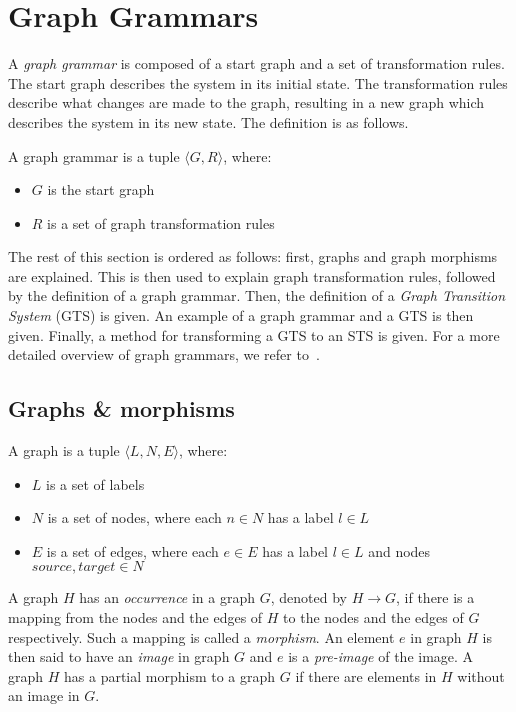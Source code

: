 \section{Graph Grammars}\label{sec:graph}
A \textit{graph grammar} is composed of a start graph and a set of transformation rules. The start graph describes the system in its initial state. The transformation rules describe what changes are made to the graph, resulting in a new graph which describes the system in its new state. The definition is as follows.

\begin{definition}
A graph grammar is a tuple $\langle G, R\rangle$, where:
\begin{itemize}
  \item $G$ is the start graph
  \item $R$ is a set of graph transformation rules
\end{itemize}
\end{definition} 

The rest of this section is ordered as follows: first, graphs and graph morphisms are explained. This is then used to explain graph transformation rules, followed by the definition of a graph grammar. Then, the definition of a \textit{Graph Transition System} (GTS) is given. An example of a graph grammar and a GTS is then given. Finally, a method for transforming a GTS to an STS is given. For a more detailed overview of graph grammars, we refer to~\cite{Rensink:graph_grammars, Heckel2006187, Andries1999}.

\subsection{Graphs \& morphisms}
\begin{definition}
A graph is a tuple $\langle L, N, E\rangle$, where:
\begin{itemize}
  \item $L$ is a set of labels
  \item $N$ is a set of nodes, where each $n \in N$ has a label $l \in L$
  \item $E$ is a set of edges, where each $e \in E$ has a label $l \in L$ and nodes $source,target \in N$
\end{itemize}
\end{definition}

A graph $H$ has an \textit{occurrence} in a graph $G$, denoted by $H \rightarrow G$, if there is a mapping from the nodes and the edges of $H$ to the nodes and the edges of $G$ respectively. Such a mapping is called a \textit{morphism}. An element $e$ in graph $H$ is then said to have an \textit{image} in graph $G$ and $e$ is a \textit{pre-image} of the image. A graph $H$ has a partial morphism to a graph $G$ if there are elements in $H$ without an image in $G$.


